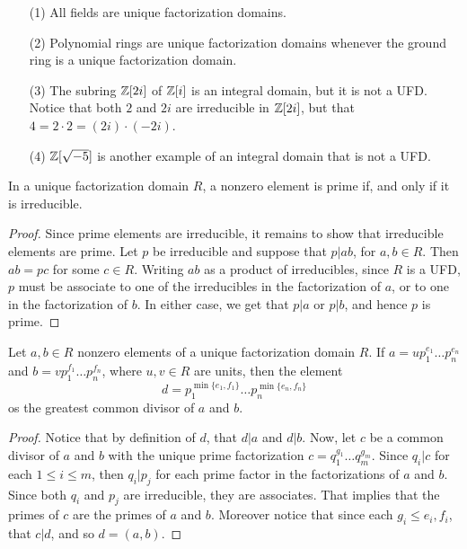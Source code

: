 \begin{example}\label{example_6.8}
  \begin{enumerate}
    \item[(1)] All fields are unique factorization domains.

    \item[(2)] Polynomial rings are unique factorization domains whenever
      the ground ring is a unique factorization domain.

    \item[(3)] The subring $\mathbb{Z}[2i]$ of $\mathbb{Z}[i]$ is an integral domain, but it
      is not a UFD. Notice that both $2$ and  $2i$ are irreducible in
      $\mathbb{Z}[2i]$, but that $4=2 \cdot 2=(2i) \cdot (-2i)$.

    \item[(4)] $\mathbb{Z}[\sqrt{-5}]$ is another example of an integral domain that
      is not a UFD.
  \end{enumerate}
\end{example}

\begin{proposition}\label{proposition_6.3.3}
  In a unique factorization domain $R$, a nonzero element is prime if, and
  only if it is irreducible.
\end{proposition}
\begin{proof}
  Since prime elements are irreducible, it remains to show that irreducible
  elements are prime. Let $p$ be irreducible and suppose that  $p|ab$, for
  $a,b \in R$. Then  $ab=pc$ for some  $c \in R$. Writing  $ab$ as a product
  of irreducibles, since  $R$ is a UFD,  $p$ must be associate to one of the
  irreducibles in the factorization of $a$, or to one in the factorization of
  $b$. In either case, we get that $p|a$ or $p|b$, and hence  $p$ is prime.
\end{proof}

\begin{proposition}\label{proposition_6.3.4}
  Let $a,b \in R$ nonzero elements of a unique factorization domain $R$. If
  $a=up_1^{e_1} \dots p_n^{e_n}$ and $b=vp_1^{f_1} \dots p_n^{f_n}$, where
  $u,v \in R$ are units, then the element
  \begin{equation*}
    d=p_1^{\min\{e_1,f_1\}} \dots p_n^{\min\{e_n,f_n\}}
  \end{equation*}
  os the greatest common divisor of $a$ and  $b$.
\end{proposition}
\begin{proof}
  Notice that by definition of $d$, that  $d|a$ and  $d|b$. Now, let  $c$ be a
  common divisor of  $a$ and  $b$ with the unique prime factorization
  $c=q_1^{g_1} \dots q_m^{g_m}$. Since $q_i|c$ for each  $1 \leq i \leq m$,
  then  $q_i|p_j$ for each prime factor in the factorizations of  $a$ and
  $b$. Since both  $q_i$ and  $p_j$ are irreducible, they are associates. That
  implies that the primes of  $c$ are the primes of  $a$ and  $b$. Moreover
  notice that since each $g_i \leq e_i,f_i$, that  $c|d$, and so  $d=(a,b)$.
\end{proof}

